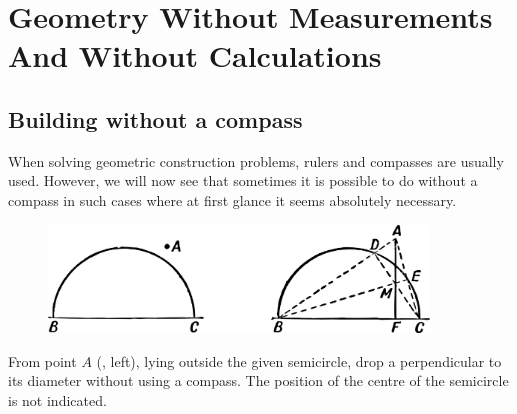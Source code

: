 



\chapter[Geometry Without Measurements And Calculations]{Geometry Without Measurements And Without Calculations}
\label{ch-10}



\section{Building without a compass}
\label{sec-10.1}

When solving geometric construction problems, rulers and compasses are usually used. However, we will now see that sometimes it is possible to do without a compass in such cases where at first glance it seems absolutely necessary.

\begin{figure}[h!]
\centering
\includegraphics[width=0.9\textwidth]{figures/ch-10/fig-141.pdf}
\end{figure}

\ques From point $A$ (, left), lying outside the given semicircle, drop a perpendicular to its diameter without using a compass. The position of the centre of the semicircle is not indicated.

